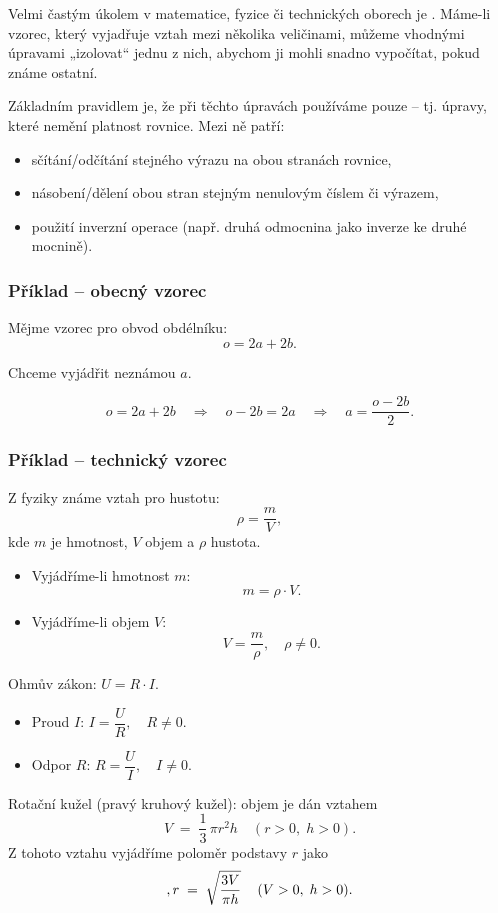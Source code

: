 \documentclass[12pt,a4paper]{article}
\begin{document}
\noindent
Velmi častým úkolem v matematice, fyzice či technických oborech je .  
Máme-li vzorec, který vyjadřuje vztah mezi několika veličinami, můžeme vhodnými úpravami „izolovat“ jednu z nich,  
abychom ji mohli snadno vypočítat, pokud známe ostatní.

Základním pravidlem je, že při těchto úpravách používáme pouze  –  
tj. úpravy, které nemění platnost rovnice. Mezi ně patří:
\begin{itemize}
    \item sčítání/odčítání stejného výrazu na obou stranách rovnice,
    \item násobení/dělení obou stran stejným nenulovým číslem či výrazem,
    \item použití inverzní operace (např. druhá odmocnina jako inverze ke druhé mocnině).
\end{itemize}

\subsubsection*{Příklad – obecný vzorec}

Mějme vzorec pro obvod obdélníku:
\[
o = 2a + 2b.
\]

Chceme vyjádřit neznámou $a$.

\[
o = 2a + 2b \quad \Rightarrow \quad o - 2b = 2a \quad \Rightarrow \quad a = \frac{o - 2b}{2}.
\]

\subsubsection*{Příklad – technický vzorec}

Z fyziky známe vztah pro hustotu:
\[
\rho = \frac{m}{V},
\]
kde $m$ je hmotnost, $V$ objem a $\rho$ hustota.

\begin{itemize}
    \item Vyjádříme-li hmotnost $m$:
    \[
    m = \rho \cdot V.
    \]

    \item Vyjádříme-li objem $V$:
    \[
    V = \frac{m}{\rho}, \quad \rho \neq 0.
    \]
\end{itemize}

\begin{examplebox}
Ohmův zákon: $U = R \cdot I$.

\begin{itemize}
    \item Proud $I$: \quad $I = \dfrac{U}{R}, \quad R \neq 0.$
    \item Odpor $R$: \quad $R = \dfrac{U}{I}, \quad I \neq 0.$
\end{itemize}
\end{examplebox}
\medskip
\begin{examplebox}
Rotační kužel (pravý kruhový kužel): objem je dán vztahem
\[
V \;=\; \frac{1}{3}\,\pi r^{2} h \quad (r>0,\; h>0).
\]
Z tohoto vztahu vyjádříme poloměr podstavy $r$ jako
\[
\\,r \;=\; \sqrt{\dfrac{3V}{\pi h}}\,\quad (V>0,\; h>0).
\]
\end{examplebox}
\end{document}
